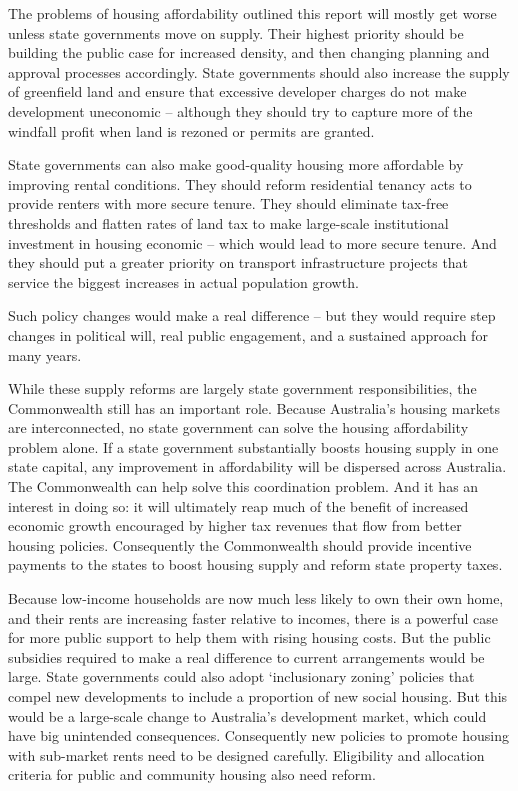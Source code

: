 The problems of housing affordability outlined this report will mostly get worse unless state governments move on supply. Their highest priority should be building the public case for increased density, and then changing planning and approval processes accordingly.
State governments should also increase the supply of greenfield land and ensure that excessive developer charges do not make development uneconomic -- although they should try to capture more of the windfall profit when land is rezoned or permits are granted.

State governments can also make good-quality housing more affordable by improving rental conditions.
They should reform residential tenancy acts to provide renters with more secure tenure.
They should eliminate tax-free thresholds and flatten rates of land tax to make large-scale institutional investment in housing economic -- which would lead to more secure tenure.
And they should put a greater priority on transport infrastructure projects that service the biggest increases in actual population growth.

Such policy changes would make a real difference -- but they would require step changes in political will, real public engagement, and a sustained approach for many years.

While these supply reforms are largely state government responsibilities, the Commonwealth still has an important role.
Because Australia's housing markets are interconnected, no state government can solve the housing affordability problem alone.
If a state government substantially boosts housing supply in one state capital, any improvement in affordability will be dispersed across Australia.
The Commonwealth can help solve this coordination problem.
And it has an interest in doing so: it will ultimately reap much of the benefit of increased economic growth encouraged by higher tax revenues that flow from better housing policies.
Consequently the Commonwealth should provide incentive payments to the states to boost housing supply and reform state property taxes.

Because low-income households are now much less likely to own their own home, and their rents are increasing faster relative to incomes, there is a powerful case for more public support to help them with rising housing costs.
But the public subsidies required to make a real difference to current arrangements would be large.
State governments could also adopt `inclusionary zoning' policies that compel new developments to include a proportion of new social housing.
But this would be a large-scale change to Australia's development market, which could have big unintended consequences.
Consequently new policies to promote housing with sub-market rents need to be designed carefully.
Eligibility and allocation criteria for public and community housing also need reform.

